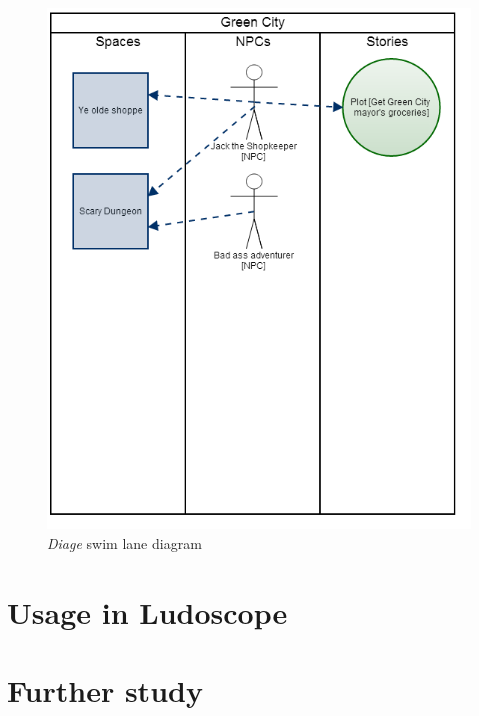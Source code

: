 \documentclass[11pt,a4paper,onecolumn,titlepage]{article}
\newcommand{\diage}{\textsl{Diage }}
\begin{document}
\begin{figure}
\label{fig:swimlane}
\includegraphics[scale=0.5]{swimlanes}
\caption{\diage swim lane diagram}
\end{figure}
\section{Usage in Ludoscope}
\section{Further study}
\label{sec:further_study}


\end{document}
